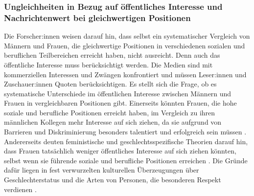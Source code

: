 \subsubsection{Ungleichheiten in Bezug auf öffentliches Interesse und Nachrichtenwert bei gleichwertigen Positionen}
Die Forscher:innen weisen darauf hin, dass selbst ein systematischer Vergleich von Männern und Frauen, die gleichwertige Positionen 
in verschiedenen sozialen und beruflichen Teilbereichen erreicht haben, nicht ausreicht. 
Denn auch das öffentliche Interesse muss berücksichtigt werden. 
Die Medien sind mit kommerziellen Interessen und Zwängen konfrontiert und müssen Leser:innen und Zuschauer:innen Quoten berücksichtigen.
Es stellt sich die Frage, ob es systematische Unterschiede im öffentlichen Interesse zwischen Männern und Frauen in 
vergleichbaren Positionen gibt.
Einerseits könnten Frauen, die hohe soziale und berufliche Positionen erreicht haben, im Vergleich zu ihren männlichen Kollegen 
mehr Interesse auf sich ziehen, da sie aufgrund von Barrieren und Diskriminierung besonders talentiert und 
erfolgreich sein müssen \cite{glass_ceiling_politics}. %
Andererseits deuten feministische und geschlechtsspezifische Theorien darauf hin, dass Frauen tatsächlich 
weniger öffentliches Interesse auf sich ziehen könnten, selbst wenn sie führende soziale und 
berufliche Positionen erreichen \cite{comparative_sociology,status_matters_for_inequality,social_difference_status_distinction}.  %
Die Gründe dafür liegen in fest verwurzelten kulturellen Überzeugungen über Geschlechterstatus und die Arten von Personen, 
die besonderen Respekt verdienen \cite{status_matters_for_inequality}. %

